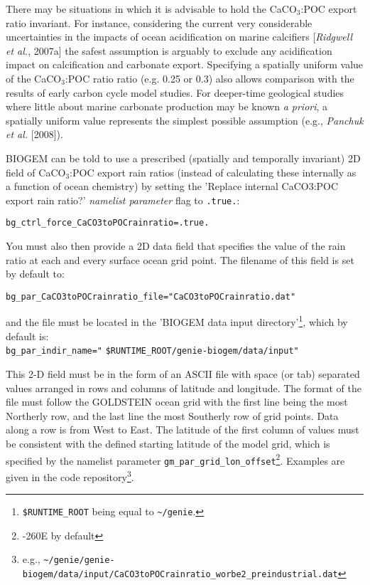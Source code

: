 There may be situations in which it is advisable to hold the CaCO\begin{math}_3\end{math}:POC export ratio invariant. For instance, considering the current very considerable uncertainties in the impacts of ocean acidification on marine calcifiers [\textit{Ridgwell et al.}, 2007a] the safest assumption is arguably to exclude any acidification impact on calcification and carbonate export. Specifying a spatially uniform value of the CaCO\begin{math}_3\end{math}:POC ratio ratio (e.g. 0.25 or 0.3) also allows comparison with the results of early carbon cycle model studies. For deeper-time geological studies where little about marine carbonate production may be known \textit{a priori}, a spatially uniform value represents the simplest possible assumption (e.g., \textit{Panchuk et al.} [2008]).

BIOGEM can be told to use a prescribed (spatially and temporally invariant) 2D field of CaCO\begin{math}_3\end{math}:POC export rain ratios (instead of calculating these internally as a function of ocean chemistry) by setting the 'Replace internal CaCO3:POC export rain ratio?' \textit{namelist parameter} flag to \texttt{.true.}:
\vspace{-2pt}\begin{verbatim}
bg_ctrl_force_CaCO3toPOCrainratio=.true.
\end{verbatim}\vspace{-2pt}
You must also then provide a 2D data field that specifies the value of the rain ratio at each and every surface ocean grid point. The filename of this field is set by default to:
\vspace{-2mm}\begin{verbatim}
bg_par_CaCO3toPOCrainratio_file="CaCO3toPOCrainratio.dat"
\end{verbatim}\vspace{-2mm}
and the file must be located in the 'BIOGEM data input directory'\footnote{\texttt{\$RUNTIME\_ROOT} being equal to \texttt{\~{}/genie}.}, which by default is:
\\\texttt{bg\_par\_indir\_name="} \texttt{\$RUNTIME\_ROOT/genie-biogem/data/input"}

\vspace{1mm}
This 2-D field must be in the form of an ASCII file with space (or tab) separated values arranged in rows and columns of latitude and longitude. The format of the file must follow the GOLDSTEIN ocean grid with the first line being the most Northerly row, and the last line the most Southerly row of grid points. Data along a row is from West to East. The latitude of the first column of values must be consistent with the defined starting latitude of the model grid, which is specified by the namelist parameter \texttt{gm\_par\_grid\_lon\_offset}\footnote{-260E by default}. Examples are given in the code repository\footnote{e.g., \texttt{\~{}/genie/genie-biogem/data/input/CaCO3toPOCrainratio\_worbe2\_preindustrial.dat}}.

